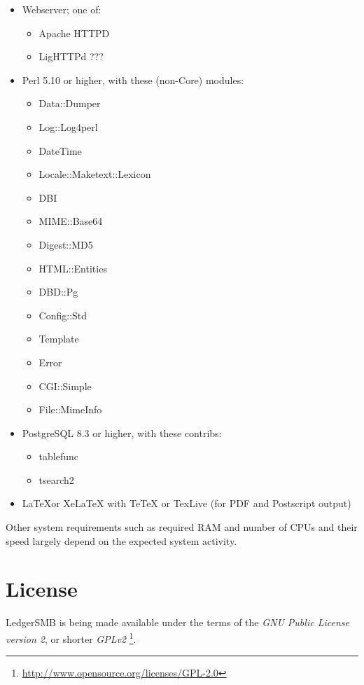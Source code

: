 \begin{itemize}
\item Webserver; one of:
\begin{itemize}
\item Apache HTTPD %
\item LigHTTPd ???
\end{itemize}
\item Perl 5.10 or higher, with these (non-Core) modules:
\begin{itemize}
\item   Data::Dumper
\item   Log::Log4perl
\item   DateTime
\item   Locale::Maketext::Lexicon
\item   DBI
\item   MIME::Base64
\item   Digest::MD5
\item   HTML::Entities
\item   DBD::Pg
\item   Config::Std
\item   Template
\item   Error
\item   CGI::Simple
\item   File::MimeInfo
\end{itemize}
\item PostgreSQL 8.3 or higher, with these contribs:
\begin{itemize}
\item tablefunc
\item tsearch2
\end{itemize}
\item \LaTeX or XeLaTeX with TeTeX or TexLive (for PDF and Postscript output)
\end{itemize}

Other system requirements such as required RAM and number of CPUs and their speed
largely depend on the expected system activity.

\section{License}

LedgerSMB is being made available under the terms of the
\textit{GNU Public License version 2}, or shorter \textit{GPLv2}
\footnote{\url{http://www.opensource.org/licenses/GPL-2.0}}.

